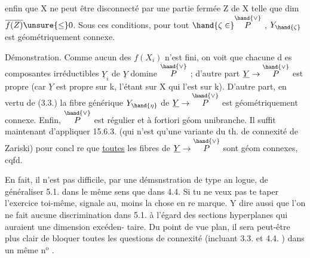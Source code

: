enfin que X ne peut être disconnecté par une partie fermée Z de X telle
que dim $\overline{f(Z)} \unsure{\leq} 0$.    Sous ces conditions, pour tout $\hand{\zeta \in} \overset{\hand{\vee}}{P}$ , $Y_{\hand{\zeta}}$ est
géométriquement connexe.

Démonstration.  Comme  aucun des $f(X_i)$ n'est fini, on voit
que chacune d es composantes irréductibles $\underline{Y}_i$ de $\underline{Y}$ domine $\overset{\hand{\vee}}{P}$ ;
d'autre part $\underline{Y} \to \overset{\hand{\vee}}{P}$ est propre (car $\underline{Y}$ est propre sur k, l'étant sur X
qui l'est sur k).  D'autre part, en vertu de (3.3.) la fibre générique
$Y_{\hand{\eta}}$ de $\underline{Y} \to \overset{\hand{\vee}}{P}$ est géométriquement connexe. Enfin, $\overset{\hand{\vee}}{P}$ est régulier et
à fortiori géom unibranche. Il suffit maintenant d'appliquer 15.6.3.
(qui n'est qu'une variante du th. de connexité  de Zariski) pour concl
re que \uline{toutes} les fibres  de $\underline{Y} \to \overset{\hand{\vee}}{P}$ sont géom connexes, cqfd.

\placedmargin{$|$} En fait,  il n'est pas difficile, par une démsnstration de type an
logue, de généraliser 5.1. dans le même sens que dans 4.4. Si tu ne
veux pas te taper l'exercice toi-même, signale au, moins la chose en re
marque. Y dire aussi que l'on ne fait aucune discrimination dans 5.1.
à l'égard des sections hyperplanes qui auraient une dimension excéden-%
\placedmargin{$|$} taire.  Du point de vue plan, il sera peut-être plus clair de bloquer
toutes les questions de connexité (incluant 3.3. et 4.4. ) dans un
même n$^{\text{o}}$ .

